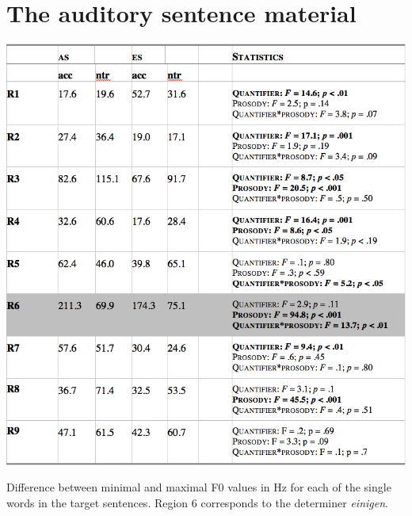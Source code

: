 \documentclass[fleqn,reqno,10pt]{article}
\begin{document}
\section{The auditory sentence material}
\label{sec:audit-sent-mater}


\begin{table}[!hp]
  \centering
  
  \includegraphics[width=\textwidth]{pictures/Acoustics/Table-B.png}

  \caption{Difference between minimal and maximal F0 values in Hz for
    each of the single words in the target sentences. Region 6
    corresponds to the determiner \emph{einigen}.} 
  \label{tab:table-B}
\end{table}
\end{document}

